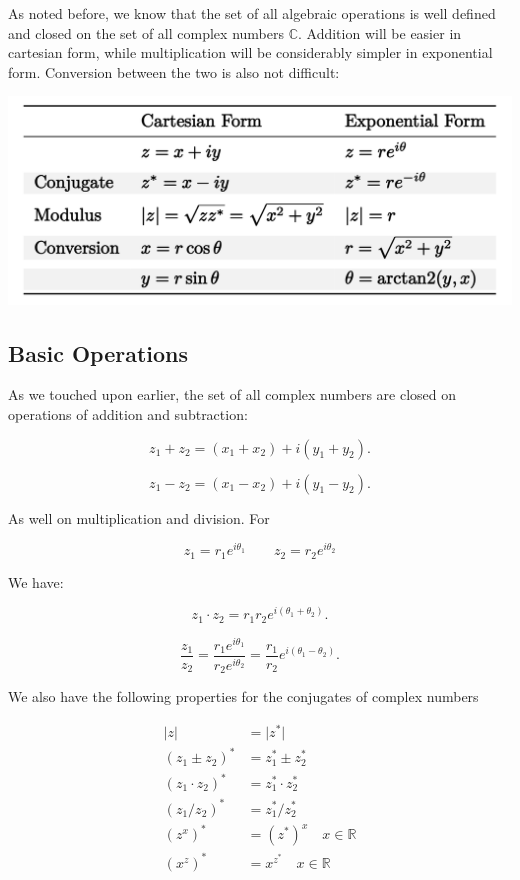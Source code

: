 \documentclass[12pt]{article}
\theoremstyle{plain}
\theoremstyle{definition}
\begin{document}
As noted before, we know that the set of all algebraic operations is well defined and closed on the set of all complex numbers $\mathbb{C}$. Addition will be easier in cartesian form, while multiplication will be considerably simpler in exponential form. Conversion between the two is also not difficult:

\includegraphics[width=\textwidth]{3_cn2}

\subsection{Basic Operations}

As we touched upon earlier, the set of all complex numbers are closed on operations of addition and subtraction:

$$z_1+z_2=(x_1+x_2)+i(y_1+y_2).$$

$$z_1-z_2=(x_1-x_2)+i(y_1-y_2).$$

As well on multiplication and division. For 

$$z_1=r_1 e^{i\theta_1} \qquad z_2=r_2 e^{i\theta_2}$$ 

We have:

$$z_1\cdot z_2=r_1 r_2 e^{i(\theta_1+\theta_2)}.$$

$$\displaystyle \frac{z_1}{z_2}=\frac{r_1 e^{i\theta_1}}{r_2 e^{i\theta_2}}=\frac{r_1}{r_2}e^{i(\theta_1-\theta_2)}.$$

We also have the following properties for the conjugates of complex numbers

\begin{align*}
    \vert z \vert &= \vert z^* \vert \\
    (z_1 \pm z_2)^* &= z_1^* \pm z_2^* \\
    (z_1 \cdot z_2)^* &= z_1^* \cdot z_2^* \\
    (z_1 / z_2)^* &= z_1^* / z_2^* \\
    (z^x)^* &= (z^*)^x \quad x \in \mathbb{R}\\
    (x^z)^* &= x^{z^*} \quad x \in \mathbb{R}
\end{align*}
\end{document}
